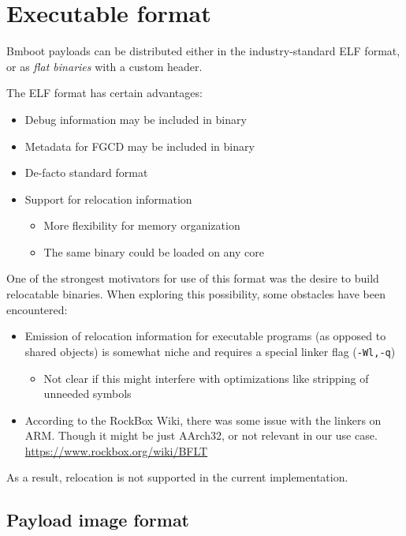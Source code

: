 \section{Executable format}

Bmboot payloads can be distributed either in the industry-standard ELF format, or as \textit{flat binaries} with a custom header.

The ELF format has certain advantages:

\begin{itemize}
    \item Debug information may be included in binary
    \item Metadata for FGCD may be included in binary
    \item De-facto standard format
    \item Support for relocation information
    \begin{itemize}
        \item More flexibility for memory organization
        \item The same binary could be loaded on any core
    \end{itemize}
\end{itemize}

One of the strongest motivators for use of this format was the desire to build relocatable binaries. When exploring this possibility, some obstacles have been encountered:

\begin{itemize}
    \item Emission of relocation information for executable programs (as opposed to shared objects) is somewhat niche and requires a special linker flag (\texttt{-Wl,-q})
    \begin{itemize}
        \item Not clear if this might interfere with optimizations like stripping of unneeded symbols
    \end{itemize}
    \item According to the RockBox Wiki, there was some issue with the linkers on ARM. Though it might be just AArch32, or not relevant in our use case. \url{https://www.rockbox.org/wiki/BFLT}
\end{itemize}

As a result, relocation is not supported in the current implementation.


\subsection{Payload image format}

